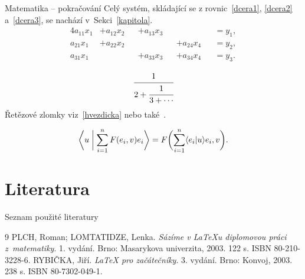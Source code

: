 \documentclass{beamer}
\begin{document}
\begin{frame}{Matematika -- pokračování}
Celý systém, skládající se z rovnic~\eqref{dcera1},
\eqref{dcera2} a~\eqref{dcera3}, se nachází 
v~Sekci~\ref{kapitola}.
\begin{alignat}{4}
  a_{11}x_1 &+ a_{12}x_2 &&+ a_{13}x_3 &&            &&=
y_1,\label{dcera1}\\
a_{21}x_1 &+ a_{22}x_2 &&            &&+ a_{24}x_4 &&=
y_2,\label{dcera2}\\
a_{31}x_1 &            &&+ a_{33}x_3 &&+ a_{34}x_4 &&=
y_3.\label{dcera3}
\end{alignat}

\begin{equation}
\cfrac{1}{2+\cfrac{1}{3 + \cdots} }\label{hvezdicka}
\end{equation}
Řetězové zlomky viz~\eqref{hvezdicka} nebo také~\cite[strana 30]{plch}.

\begin{equation}
\biggl\langle u \biggm| \sum_{i=1}^{n} F(e_i,v) e_i \biggr \rangle
= F \biggl ( \sum_{i=1}^n \langle  e_i | u \rangle e_i,v\biggr).
\end{equation}
\end{frame}

\section{Literatura}


\begin{frame}{Seznam použité literatury}

\begin{thebibliography}{9}
 PLCH, Roman; LOMTATIDZE, Lenka.
\emph{Sázíme v \LaTeX{}u diplomovou práci z~matematiky}. 1. vydání. Brno:
Masarykova univerzita, 2003. 122 s. ISBN 80-210-3228-6. 
 RYBIČKA, Jiří. \emph{\LaTeX{} pro začátečníky}. 3. vydání.
Brno: Konvoj, 2003. 238 s. ISBN 80-7302-049-1.
\end{thebibliography}
\end{frame}
\end{document}
